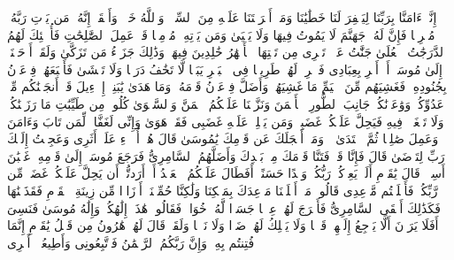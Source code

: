 \stopbuffer%
\startbuffer[\q:20:73]
إِنَّاۤ ءَامَنَّا بِرَبِّنَا لِیَغۡفِرَ لَنَا خَطَٰیَٰنَا وَمَاۤ أَكۡرَهۡتَنَا عَلَیۡهِ مِنَ ٱلسِّحۡرِۗ وَٱللَّهُ خَیۡرࣱ وَأَبۡقَىٰۤ%
\stopbuffer%
\startbuffer[\q:20:74]
إِنَّهُۥ مَن یَأۡتِ رَبَّهُۥ مُجۡرِمࣰا فَإِنَّ لَهُۥ جَهَنَّمَ لَا یَمُوتُ فِیهَا وَلَا یَحۡیَىٰ%
\stopbuffer%
\startbuffer[\q:20:75]
وَمَن یَأۡتِهِۦ مُؤۡمِنࣰا قَدۡ عَمِلَ ٱلصَّٰلِحَٰتِ فَأُو۟لَٰۤئِكَ لَهُمُ ٱلدَّرَجَٰتُ ٱلۡعُلَىٰ%
\stopbuffer%
\startbuffer[\q:20:76]
جَنَّٰتُ عَدۡنࣲ تَجۡرِی مِن تَحۡتِهَا ٱلۡأَنۡهَٰرُ خَٰلِدِینَ فِیهَاۚ وَذَٰلِكَ جَزَاۤءُ مَن تَزَكَّىٰ%
\stopbuffer%
\startbuffer[\q:20:77]
وَلَقَدۡ أَوۡحَیۡنَاۤ إِلَىٰ مُوسَىٰۤ أَنۡ أَسۡرِ بِعِبَادِی فَٱضۡرِبۡ لَهُمۡ طَرِیقࣰا فِی ٱلۡبَحۡرِ یَبَسࣰا لَّا تَخَٰفُ دَرَكࣰا وَلَا تَخۡشَىٰ%
\stopbuffer%
\startbuffer[\q:20:78]
فَأَتۡبَعَهُمۡ فِرۡعَوۡنُ بِجُنُودِهِۦ فَغَشِیَهُم مِّنَ ٱلۡیَمِّ مَا غَشِیَهُمۡ%
\stopbuffer%
\startbuffer[\q:20:79]
وَأَضَلَّ فِرۡعَوۡنُ قَوۡمَهُۥ وَمَا هَدَىٰ%
\stopbuffer%
\startbuffer[\q:20:80]
یَٰبَنِیۤ إِسۡرَٰۤءِیلَ قَدۡ أَنجَیۡنَٰكُم مِّنۡ عَدُوِّكُمۡ وَوَٰعَدۡنَٰكُمۡ جَانِبَ ٱلطُّورِ ٱلۡأَیۡمَنَ وَنَزَّلۡنَا عَلَیۡكُمُ ٱلۡمَنَّ وَٱلسَّلۡوَىٰ%
\stopbuffer%
\startbuffer[\q:20:81]
كُلُوا۟ مِن طَیِّبَٰتِ مَا رَزَقۡنَٰكُمۡ وَلَا تَطۡغَوۡا۟ فِیهِ فَیَحِلَّ عَلَیۡكُمۡ غَضَبِیۖ وَمَن یَحۡلِلۡ عَلَیۡهِ غَضَبِی فَقَدۡ هَوَىٰ%
\stopbuffer%
\startbuffer[\q:20:82]
وَإِنِّی لَغَفَّارࣱ لِّمَن تَابَ وَءَامَنَ وَعَمِلَ صَٰلِحࣰا ثُمَّ ٱهۡتَدَىٰ%
\stopbuffer%
\startbuffer[\q:20:83]
۞ وَمَاۤ أَعۡجَلَكَ عَن قَوۡمِكَ یَٰمُوسَىٰ%
\stopbuffer%
\startbuffer[\q:20:84]
قَالَ هُمۡ أُو۟لَاۤءِ عَلَىٰۤ أَثَرِی وَعَجِلۡتُ إِلَیۡكَ رَبِّ لِتَرۡضَىٰ%
\stopbuffer%
\startbuffer[\q:20:85]
قَالَ فَإِنَّا قَدۡ فَتَنَّا قَوۡمَكَ مِنۢ بَعۡدِكَ وَأَضَلَّهُمُ ٱلسَّامِرِیُّ%
\stopbuffer%
\startbuffer[\q:20:86]
فَرَجَعَ مُوسَىٰۤ إِلَىٰ قَوۡمِهِۦ غَضۡبَٰنَ أَسِفࣰاۚ قَالَ یَٰقَوۡمِ أَلَمۡ یَعِدۡكُمۡ رَبُّكُمۡ وَعۡدًا حَسَنًاۚ أَفَطَالَ عَلَیۡكُمُ ٱلۡعَهۡدُ أَمۡ أَرَدتُّمۡ أَن یَحِلَّ عَلَیۡكُمۡ غَضَبࣱ مِّن رَّبِّكُمۡ فَأَخۡلَفۡتُم مَّوۡعِدِی%
\stopbuffer%
\startbuffer[\q:20:87]
قَالُوا۟ مَاۤ أَخۡلَفۡنَا مَوۡعِدَكَ بِمَلۡكِنَا وَلَٰكِنَّا حُمِّلۡنَاۤ أَوۡزَارࣰا مِّن زِینَةِ ٱلۡقَوۡمِ فَقَذَفۡنَٰهَا فَكَذَٰلِكَ أَلۡقَى ٱلسَّامِرِیُّ%
\stopbuffer%
\startbuffer[\q:20:88]
فَأَخۡرَجَ لَهُمۡ عِجۡلࣰا جَسَدࣰا لَّهُۥ خُوَارࣱ فَقَالُوا۟ هَٰذَاۤ إِلَٰهُكُمۡ وَإِلَٰهُ مُوسَىٰ فَنَسِیَ%
\stopbuffer%
\startbuffer[\q:20:89]
أَفَلَا یَرَوۡنَ أَلَّا یَرۡجِعُ إِلَیۡهِمۡ قَوۡلࣰا وَلَا یَمۡلِكُ لَهُمۡ ضَرࣰّا وَلَا نَفۡعࣰا%
\stopbuffer%
\startbuffer[\q:20:90]
وَلَقَدۡ قَالَ لَهُمۡ هَٰرُونُ مِن قَبۡلُ یَٰقَوۡمِ إِنَّمَا فُتِنتُم بِهِۦۖ وَإِنَّ رَبَّكُمُ ٱلرَّحۡمَٰنُ فَٱتَّبِعُونِی وَأَطِیعُوۤا۟ أَمۡرِی%
